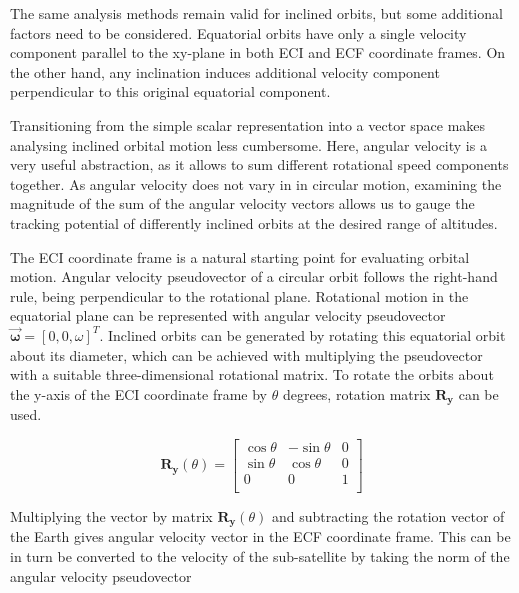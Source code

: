 \documentclass[english, 12pt, a4paper, elec, utf8, a-1b, online]{aaltothesis}
\begin{document}
The same analysis methods remain valid for inclined orbits, but some additional factors need to be considered.
Equatorial orbits have only a single velocity component parallel to the xy-plane in both ECI and ECF coordinate frames.
On the other hand, any inclination induces additional velocity component perpendicular to this original equatorial component.

Transitioning from the simple scalar representation into a vector space makes analysing inclined orbital motion less cumbersome.
Here, angular velocity is a very useful abstraction, as it allows to sum different rotational speed components together.
As angular velocity does not vary in in circular motion, examining the magnitude of the sum of the angular velocity vectors allows us to gauge the tracking potential of differently inclined orbits at the desired range of altitudes.

The ECI coordinate frame is a natural starting point for evaluating orbital motion.
Angular velocity pseudovector of a circular orbit follows the right-hand rule, being perpendicular to the rotational plane.
Rotational motion in the equatorial plane can be represented with angular velocity pseudovector $\bm{\vec{\omega}} = [0,0,\omega]^T$.
Inclined orbits can be generated by rotating this equatorial orbit about its diameter, which can be achieved with multiplying the pseudovector with a suitable three-dimensional rotational matrix.
To rotate the orbits about the y-axis of the ECI coordinate frame by $\theta$ degrees, rotation matrix $\bm{R_y}$ can be used.

\begin{equation*}
  \bm{R_y}(\theta) = \begin{bmatrix}
    \cos \theta & -\sin \theta & 0 \\[3pt]
    \sin \theta &  \cos \theta & 0 \\[3pt]
    0           &  0           & 1 \\
    \end{bmatrix}
\end{equation*}

Multiplying the vector by matrix $\bm{R_y}(\theta)$ and subtracting the rotation vector of the Earth gives angular velocity vector in the ECF coordinate frame.
This can be in turn be converted to the velocity of the sub-satellite by taking the norm of the angular velocity pseudovector
\end{document}
